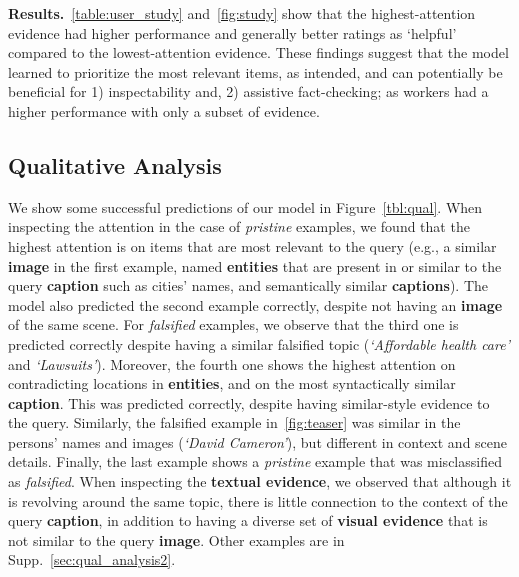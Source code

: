 \textbf{Results.}~\autoref{table:user_study} and~\autoref{fig:study} show that the highest-attention evidence had higher performance and generally better ratings as `helpful' compared to the lowest-attention evidence. These findings suggest that the model learned to prioritize the most relevant items, as intended, and can potentially be beneficial for 1) inspectability and, 2) assistive fact-checking; as workers had a higher performance with only a subset of evidence. 


\subsection{Qualitative Analysis}
We show some successful predictions of our model in Figure~\ref{tbl:qual}. When inspecting the attention in the case of \textit{pristine} examples, we found that the highest attention is on items that are most relevant to the query (e.g., a similar \textbf{\textcolor{myOrange}{image}} in the first example, named \textbf{\textcolor{myblue}{entities}} that are present in or similar to the query \textbf{\textcolor{myblue}{caption}} such as cities' names, and semantically similar \textbf{\textcolor{myblue}{captions}}). The model also predicted the second example correctly, despite not having an \textbf{\textcolor{myOrange}{image}} of the same scene. For \textit{falsified} examples, we observe that the third one is predicted correctly despite having a similar falsified topic (\textit{`Affordable health care'} and \textit{`Lawsuits'}). Moreover, the fourth one shows the highest attention on contradicting locations in \textbf{\textcolor{myblue}{entities}}, and on the most syntactically similar \textbf{\textcolor{myblue}{caption}}. This was predicted correctly, despite having similar-style evidence to the query. Similarly, the falsified example in~\autoref{fig:teaser} was similar in the persons' names and images (\textit{`David Cameron'}), but different in context and scene details. Finally, the last example shows a \textit{pristine} example that was misclassified as \textit{falsified}. When inspecting the \textbf{\textcolor{myblue}{textual evidence}}, we observed that although it is revolving around the same topic, there is little connection to the context of the query \textbf{\textcolor{myblue}{caption}}, in addition to having a diverse set of \textbf{\textcolor{myOrange}{visual evidence}} that is not similar to the query \textbf{\textcolor{myOrange}{image}}. Other examples are in Supp.~\ref{sec:qual_analysis2}.

